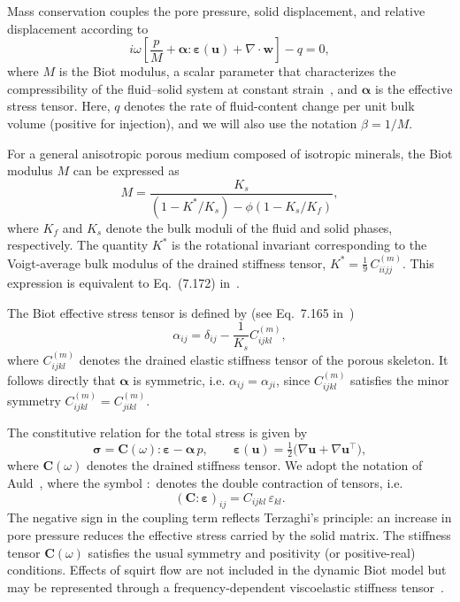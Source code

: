 \documentclass[pdflatex,sn-mathphys-num]{sn-jnl}
\theoremstyle{thmstyleone}%
\theoremstyle{thmstyletwo}%
\theoremstyle{thmstylethree}%
\theoremstyle{definition}
\begin{document}
	
	Mass conservation couples the pore pressure, solid displacement, and relative displacement according to
	\begin{equation}
		i\omega \left[ \frac{p}{M}
		+ \boldsymbol{\alpha}:\boldsymbol{\varepsilon}(\mathbf{u})
		+ \nabla\cdot\mathbf{w}\right] - q = 0,
		\label{eq:mass_balance_mod}
	\end{equation}
	where $M$ is the Biot modulus, a scalar parameter that characterizes the compressibility of the fluid–solid system at constant strain~\cite{Carcione2022}, and $\boldsymbol{\alpha}$ is the effective stress tensor. Here, $q$ denotes the rate of fluid-content change per unit bulk volume (positive for injection), and we will also use the notation $\beta = 1/M$.
	
	
	For a general anisotropic porous medium composed of isotropic minerals, the Biot modulus $M$ can be expressed as
	\begin{equation}
		M =
		\frac{K_s}{
			(1 - K^{*}/K_s)
			-
			\phi \left(1 - K_s/K_f\right)
		},
	\end{equation}
	where $K_f$ and $K_s$ denote the bulk moduli of the fluid and solid phases, respectively. The quantity $K^{*}$ is the rotational invariant corresponding to the Voigt-average bulk modulus of the drained stiffness tensor,
	$K^* = \frac{1}{9}\, C^{(m)}_{iijj}$.
	This expression is equivalent to Eq.~(7.172) in~\cite{Carcione2022}.
	
	The Biot effective stress tensor is defined by (see Eq.~7.165 in~\cite{Carcione2022})
	\begin{equation}
		\alpha_{ij}
		=
		\delta_{ij}
		-
		\frac{1}{K_s} C^{(m)}_{ijkl},
		\label{eq_alpha}
	\end{equation}
	where $C^{(m)}_{ijkl}$ denotes the drained elastic stiffness tensor of the porous skeleton. It follows directly that $\boldsymbol{\alpha}$ is symmetric, i.e. $\alpha_{ij} = \alpha_{ji}$, since $C^{(m)}_{ijkl}$ satisfies the minor symmetry $C^{(m)}_{ijkl} = C^{(m)}_{jikl}$.
	
	\color{black}
	
	The constitutive relation for the total stress is given by
	\begin{equation*}
		\boldsymbol{\sigma} = \mathbf{C}(\omega):\boldsymbol{\varepsilon} - \boldsymbol{\alpha}\,p,
		\qquad
		\boldsymbol{\varepsilon}(\mathbf{u}) = \tfrac{1}{2}\big(\nabla\mathbf{u} + \nabla\mathbf{u}^\top\big),
	\end{equation*}
	where $\mathbf{C}(\omega)$ denotes the drained stiffness tensor. We adopt the notation of Auld~\cite{Auld1973}, where the symbol $:$ denotes the double contraction of tensors, i.e.
	\[
	(\mathbf{C} : \boldsymbol{\varepsilon})_{ij} = C_{ijkl}\,\varepsilon_{kl}.
	\]
	The negative sign in the coupling term reflects Terzaghi’s principle: an increase in pore pressure reduces the effective stress carried by the solid matrix. The stiffness tensor $\mathbf{C}(\omega)$ satisfies the usual symmetry and positivity (or positive-real) conditions. Effects of squirt flow are not included in the dynamic Biot model but may be represented through a frequency-dependent viscoelastic stiffness tensor~\cite{pride2004, muller2010seismic, jakobsen2009unified}.
	
\end{document}
